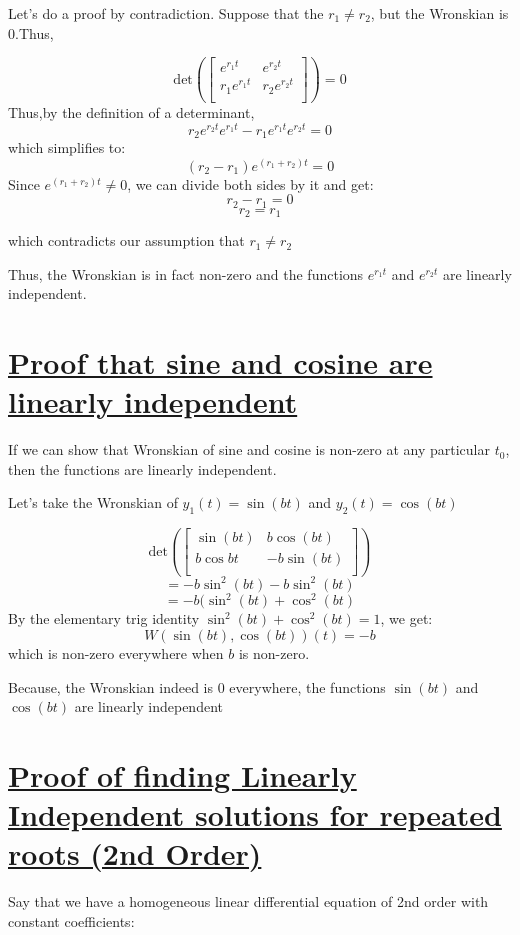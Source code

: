 \documentclass{report}
\begin{document}
Let's do a proof by contradiction. Suppose that the $r_1 \neq r_2$, but the Wronskian is 0.Thus,

$$
    \text{det}\left(\begin{bmatrix}
        e^{r_1t} & e^{r_2t} \\
        r_1 e^{r_1t} & r_2 e^{r_2t} \\
    \end{bmatrix}\right)
    = 0
$$
Thus,by the definition of a determinant,
$$r_2e^{r_2t}e^{r_1t} -r_1e^{r_1t}e^{r_2t} = 0$$
which simplifies to:
$$(r_2-r_1)e^{(r_1+r_2)t} = 0$$
Since $e^{(r_1+r_2)t} \neq 0$, we can divide both sides by it and get:
$$r_2 -r_1 = 0$$
$$r_2 = r_1$$

which contradicts our assumption that $r_1 \neq r_2$

Thus, the Wronskian is in fact non-zero and the functions $e^{r_1t}$ and $e^{r_2t}$ are linearly independent.

\section{\hyperref[sinLin]{Proof that sine and cosine are linearly independent}}
\label{sec:prSinLin}
If we can show that Wronskian of sine and cosine is non-zero at any particular $t_0$, then the functions are linearly independent.

Let's take the Wronskian of $y_1(t) = \sin(bt)$ and $y_2(t) = \cos(bt)$

$$
    \text{det}\left(\begin{bmatrix}
        \sin(bt) & b\cos(bt)\\
        b\cos{bt} & -b\sin(bt) \\
    \end{bmatrix}\right)
$$
$$=-b\sin^2(bt)-b\sin^2(bt)$$
$$=-b(\sin^2(bt) + \cos^2(bt)$$
By the elementary trig identity $\sin^2(bt) + \cos^2(bt) = 1$, we get:
$$W(\sin(bt),\cos(bt))(t)=-b$$
which is non-zero everywhere when $b$ is non-zero.

Because, the Wronskian indeed is 0 everywhere, the functions $\sin(bt)$ and $\cos(bt)$ are linearly independent


\section{\hyperref[repRoot]{Proof of finding Linearly Independent solutions for repeated roots (2nd Order)}}
\label{sec:PrRepRoot}
Say that we have a homogeneous linear differential equation of 2nd order with constant coefficients:
\end{document}
